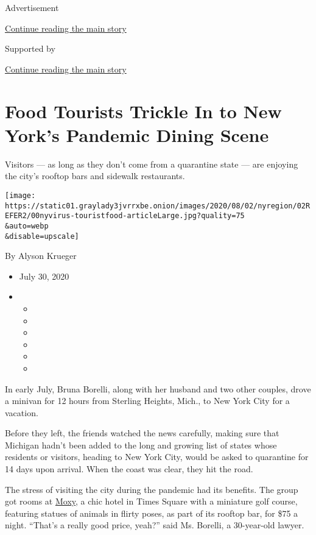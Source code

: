 Advertisement

\protect\hyperlink{after-top}{Continue reading the main story}

Supported by

\protect\hyperlink{after-sponsor}{Continue reading the main story}

\hypertarget{food-tourists-trickle-in-to-new-yorks-pandemic-dining-scene}{%
\section{Food Tourists Trickle In to New York's Pandemic Dining
Scene}\label{food-tourists-trickle-in-to-new-yorks-pandemic-dining-scene}}

Visitors --- as long as they don't come from a quarantine state --- are
enjoying the city's rooftop bars and sidewalk restaurants.

\texttt{[image: https://static01.graylady3jvrrxbe.onion/images/2020/08/02/nyregion/02REFER2/00nyvirus-touristfood-articleLarge.jpg?quality=75\\\&auto=webp\\\&disable=upscale]}

By Alyson Krueger

\begin{itemize}
\item
  July 30, 2020
\item
  \begin{itemize}
  \item
  \item
  \item
  \item
  \item
  \item
  \end{itemize}
\end{itemize}

In early July, Bruna Borelli, along with her husband and two other
couples, drove a minivan for 12 hours from Sterling Heights, Mich., to
New York City for a vacation.

Before they left, the friends watched the news carefully, making sure
that Michigan hadn't been added to the long and growing list of states
whose residents or visitors, heading to New York City, would be asked to
quarantine for 14 days upon arrival. When the coast was clear, they hit
the road.

The stress of visiting the city during the pandemic had its benefits.
The group got rooms at
\href{https://www.marriott.com/hotels/travel/nycox-moxy-nyc-times-square/?scid=bb6e16b5-1692-44e9-9459-428cef21e75b\&ppc=ppc\&pId=ustbppc\&nst=paid\&gclid=EAIaIQobChMIzfqa1uvu6gIVCYvICh1WVAGtEAAYASAAEgLHAfD_BwE\&gclsrc=aw.ds}{Moxy},
a chic hotel in Times Square with a miniature golf course, featuring
statues of animals in flirty poses, as part of its rooftop bar, for \$75
a night. ``That's a really good price, yeah?'' said Ms. Borelli, a
30-year-old lawyer.

